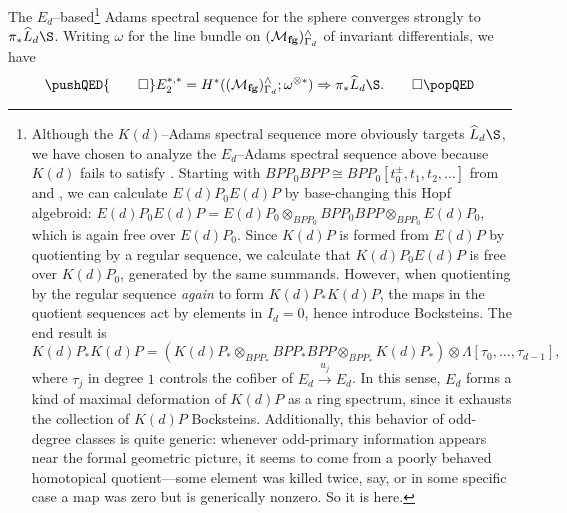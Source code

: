 \begin{theorem}\label{ASSForLKdS}
The \(E_d\)--based\footnote{Although the \(K(d)\)--Adams spectral sequence more obviously targets \(\widehat L_d \S\), we have chosen to analyze the \(E_d\)--Adams spectral sequence above because \(K(d)\) fails to satisfy {\CH}.  Starting with \(BPP_0 BPP \cong BPP_0[t_0^{\pm}, t_1, t_2, \ldots]\) from  and , we can calculate \(E(d)P_0 E(d)P\) by base-changing this Hopf algebroid: \(E(d)P_0 E(d)P = E(d)P_0 \otimes_{BPP_0} BPP_0 BPP \otimes_{BPP_0} E(d)P_0\), which is again free over \(E(d)P_0\).  Since \(K(d)P\) is formed from \(E(d)P\) by quotienting by a regular sequence, we calculate that \(K(d)P_0 E(d)P\) is free over \(K(d)P_0\), generated by the same summands.  However, when quotienting by the regular sequence \emph{again} to form \(K(d)P_* K(d)P\), the maps in the quotient sequences act by elements in \(I_d = 0\), hence introduce Bocksteins.  The end result is \[K(d)P_* K(d)P = \left(K(d)P_* \otimes_{BPP_*} BPP_* BPP \otimes_{BPP_*} K(d)P_*\right) \otimes \Lambda[\tau_0, \ldots, \tau_{d-1}],\] where \(\tau_j\) in degree \(1\) controls the cofiber of \(E_d \xrightarrow{u_j} E_d\).  In this sense, \(E_d\) forms a kind of maximal deformation of \(K(d)P\) as a ring spectrum, since it exhausts the collection of \(K(d)P\) Bocksteins.  Additionally, this behavior of odd-degree classes is quite generic: whenever odd-primary information appears near the formal geometric picture, it seems to come from a poorly behaved homotopical quotient---some element was killed twice, say, or in some specific case a map was zero but is generically nonzero.  So it is here.}
Adams spectral sequence for the sphere converges strongly to \(\pi_* \widehat L_d \S\).  Writing \(\omega\) for the line bundle on \((\mathcal{M}_{\mathbf{fg}})^\wedge_{\Gamma_d}\) of invariant differentials, we have
\[\pushQED{\qed}
E_2^{*, *} = H^*((\moduli{fg})^\wedge_{\Gamma_d}; \omega^{\otimes *}) \Rightarrow \pi_* \widehat L_d \S. \qedhere
\popQED\]
\end{theorem}

